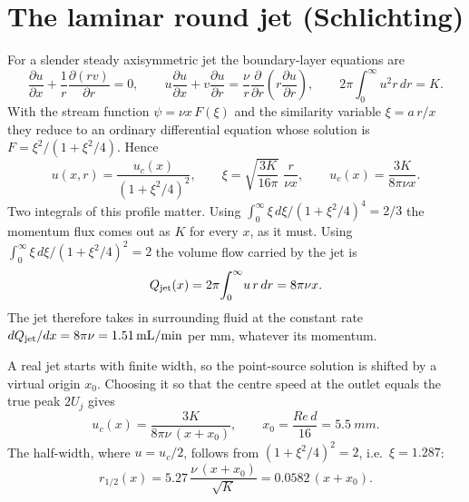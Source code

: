 \documentclass[10pt,a4paper]{article}
\begin{document}
\section{The laminar round jet (Schlichting)}
For a slender steady axisymmetric jet the boundary-layer equations are
\begin{equation}
\frac{\partial u}{\partial x}+\frac1r\frac{\partial (rv)}{\partial r}=0,\qquad
u\frac{\partial u}{\partial x}+v\frac{\partial u}{\partial r}
   =\frac{\nu}{r}\frac{\partial}{\partial r}\!\left(r\frac{\partial u}{\partial r}\right),
\qquad 2\pi\!\int_0^\infty\! u^2 r\,dr=K .
\end{equation}
With the stream function $\psi=\nu x\,F(\xi)$ and the similarity variable $\xi=a\,r/x$ they reduce to an
ordinary differential equation whose solution is $F=\xi^2/(1+\xi^2/4)$. Hence
\begin{equation}
u(x,r)=\frac{u_c(x)}{\left(1+\xi^2/4\right)^2},\qquad
\xi=\sqrt{\frac{3K}{16\pi}}\;\frac{r}{\nu x},\qquad u_c(x)=\frac{3K}{8\pi\nu x}.
\end{equation}
Two integrals of this profile matter. Using $\int_0^\infty \xi\,d\xi/(1+\xi^2/4)^4=2/3$ the momentum
flux comes out as $K$ for every $x$, as it must. Using $\int_0^\infty \xi\,d\xi/(1+\xi^2/4)^2=2$ the
volume flow carried by the jet is
\begin{equation}
Q_{\rm jet}(x)=2\pi\!\int_0^\infty\! u\,r\,dr=8\pi\nu x .\label{eq:ent}
\end{equation}
The jet therefore takes in surrounding fluid at the constant rate
$dQ_{\rm jet}/dx=8\pi\nu=\SI{1.51}{mL/min}$ per mm, whatever its momentum.

A real jet starts with finite width, so the point-source solution is shifted by a virtual origin $x_0$.
Choosing it so that the centre speed at the outlet equals the true peak $2U_j$ gives
\begin{equation}
u_c(x)=\frac{3K}{8\pi\nu\,(x+x_0)},\qquad x_0=\frac{Re\,d}{16}=\SI{5.5}{mm}.\label{eq:uc}
\end{equation}
The half-width, where $u=u_c/2$, follows from $(1+\xi^2/4)^2=2$, i.e.\ $\xi=1.287$:
\begin{equation}
r_{1/2}(x)=5.27\,\frac{\nu\,(x+x_0)}{\sqrt K}=0.0582\,(x+x_0).\label{eq:rh}
\end{equation}
\end{document}
